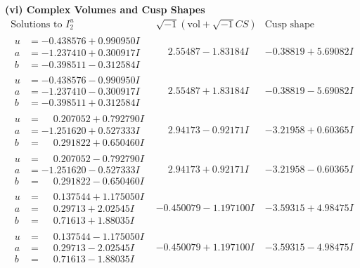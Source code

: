 \documentclass[1p]{elsarticle_modified}
\theoremstyle{definition}
\newcommand{\I}{\sqrt{-1}}
\begin{document}
\newpage\flushleft \textbf{(vi) Complex Volumes and Cusp Shapes}
$$\begin{array}{c|c|c}  
\text{Solutions to }I^u_{2}& \I (\text{vol} + \sqrt{-1}CS) & \text{Cusp shape}\\
 \hline 
\begin{aligned}
u &= -0.438576 + 0.990950 I \\
a &= -1.237410 + 0.300917 I \\
b &= -0.398511 - 0.312584 I\end{aligned}
 & \phantom{-}2.55487 - 1.83184 I & -0.38819 + 5.69082 I \\ \hline\begin{aligned}
u &= -0.438576 - 0.990950 I \\
a &= -1.237410 - 0.300917 I \\
b &= -0.398511 + 0.312584 I\end{aligned}
 & \phantom{-}2.55487 + 1.83184 I & -0.38819 - 5.69082 I \\ \hline\begin{aligned}
u &= \phantom{-}0.207052 + 0.792790 I \\
a &= -1.251620 + 0.527333 I \\
b &= \phantom{-}0.291822 + 0.650460 I\end{aligned}
 & \phantom{-}2.94173 - 0.92171 I & -3.21958 + 0.60365 I \\ \hline\begin{aligned}
u &= \phantom{-}0.207052 - 0.792790 I \\
a &= -1.251620 - 0.527333 I \\
b &= \phantom{-}0.291822 - 0.650460 I\end{aligned}
 & \phantom{-}2.94173 + 0.92171 I & -3.21958 - 0.60365 I \\ \hline\begin{aligned}
u &= \phantom{-}0.137544 + 1.175050 I \\
a &= \phantom{-}0.29713 + 2.02545 I \\
b &= \phantom{-}0.71613 + 1.88035 I\end{aligned}
 & -0.450079 - 1.197100 I & -3.59315 + 4.98475 I \\ \hline\begin{aligned}
u &= \phantom{-}0.137544 - 1.175050 I \\
a &= \phantom{-}0.29713 - 2.02545 I \\
b &= \phantom{-}0.71613 - 1.88035 I\end{aligned}
 & -0.450079 + 1.197100 I & -3.59315 - 4.98475 I \\ \hline\begin{aligned}

\end{aligned}
\end{array}$$
\end{document}
